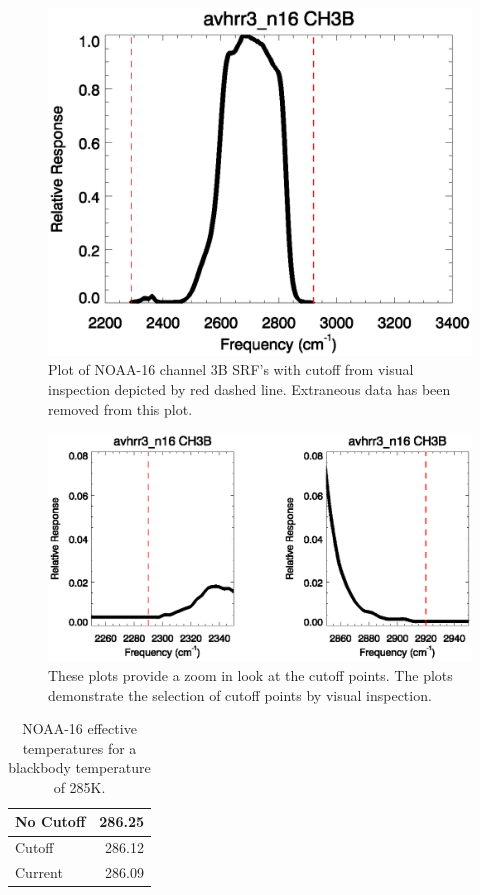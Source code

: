 \begin{figure}[htp]
  \centering
  \includegraphics[scale=1]{graphics/nominal/cutoff_complete.eps}
  \caption{Plot of NOAA-16 channel 3B SRF's with cutoff from visual inspection depicted
           by red dashed line. Extraneous data has been removed from this plot.}
  \label{fig:cutoff_complete}
\end{figure}

\begin{figure}[htp]
  \centering
  \includegraphics[scale=1]{graphics/zoom/cutoff_inspection.eps}
  \caption{These plots provide a zoom in look at the cutoff points. The
   plots demonstrate the selection of cutoff points by visual inspection.}
  \label{fig:cutoff_inspection}
\end{figure}
\newpage

\begin{table}[ht]
  \centering
  \begin{tabular}{| l | r |}
    \hline
    \hline
    No Cutoff & 286.25 \\
    \hline
    Cutoff & 286.12 \\
    \hline
    Current & 286.09 \\
    \hline
  \end{tabular}
  \caption{NOAA-16 effective temperatures for a blackbody temperature of 285K.}
  \label{tab:N16_teff}
\end{table}
 

